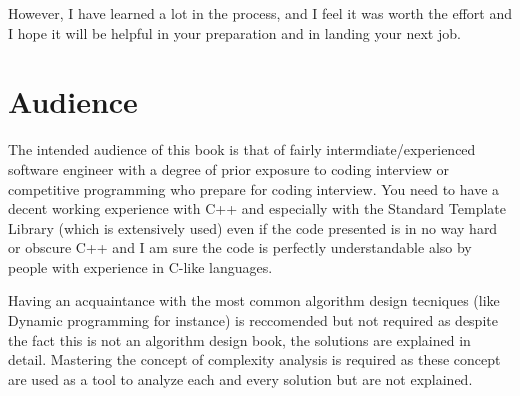 However, I have learned a lot in the process, and I feel it was worth the effort and I hope it will be helpful in your preparation and in landing your next job. 

\section*{Audience}
The intended audience of this book is that of fairly intermdiate/experienced software engineer with a degree of prior exposure to coding interview or competitive programming who prepare for coding interview.
You need to have a decent working experience with C++ and especially with the Standard Template Library (which is extensively used) even if the code presented is in no way hard or obscure C++ and I am sure the code is perfectly understandable also by people with experience in C-like languages. 

Having an acquaintance with the most common algorithm design tecniques (like Dynamic programming for instance) is reccomended but not required as despite the fact this is not an algorithm design book, the solutions are explained in detail. Mastering the concept of complexity analysis is required as these concept are used as a tool to analyze each and every solution but are not explained.



